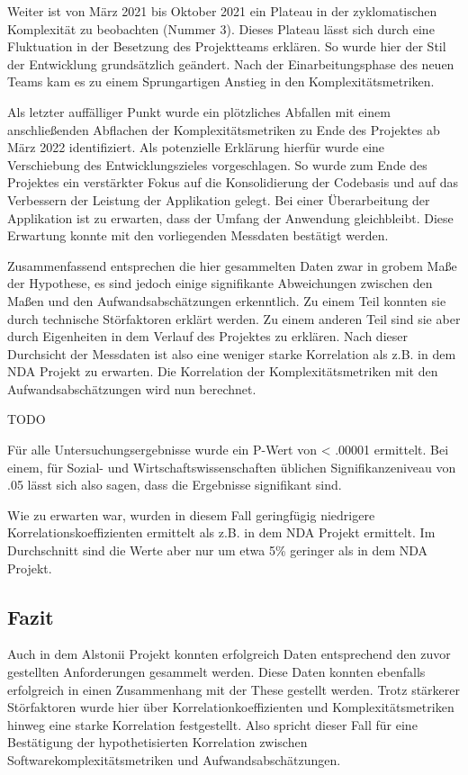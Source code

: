 Weiter ist von März 2021 bis Oktober 2021 ein Plateau in der
zyklomatischen Komplexität zu beobachten (Nummer 3). Dieses Plateau
lässt sich durch eine Fluktuation in der Besetzung des Projektteams
erklären. So wurde hier der Stil der Entwicklung grundsätzlich geändert.
Nach der Einarbeitungsphase des neuen Teams kam es zu einem
Sprungartigen Anstieg in den Komplexitätsmetriken.

Als letzter auffälliger Punkt wurde ein plötzliches Abfallen mit einem
anschließenden Abflachen der Komplexitätsmetriken zu Ende des Projektes
ab März 2022 identifiziert. Als potenzielle Erklärung hierfür wurde eine
Verschiebung des Entwicklungszieles vorgeschlagen. So wurde zum Ende des
Projektes ein verstärkter Fokus auf die Konsolidierung der Codebasis und
auf das Verbessern der Leistung der Applikation gelegt. Bei einer
Überarbeitung der Applikation ist zu erwarten, dass der Umfang der
Anwendung gleichbleibt. Diese Erwartung konnte mit den vorliegenden
Messdaten bestätigt werden.

Zusammenfassend entsprechen die hier gesammelten Daten zwar in grobem
Maße der Hypothese, es sind jedoch einige signifikante Abweichungen
zwischen den Maßen und den Aufwandsabschätzungen erkenntlich. Zu einem
Teil konnten sie durch technische Störfaktoren erklärt werden. Zu einem
anderen Teil sind sie aber durch Eigenheiten in dem Verlauf des
Projektes zu erklären. Nach dieser Durchsicht der Messdaten ist also
eine weniger starke Korrelation als z.B. in dem NDA Projekt zu erwarten.
Die Korrelation der Komplexitätsmetriken mit den Aufwandsabschätzungen
wird nun berechnet.

TODO

Für alle Untersuchungsergebnisse wurde ein P-Wert von \textless{} .00001
ermittelt.
Bei einem, für Sozial- und Wirtschaftswissenschaften üblichen
Signifikanzeniveau von .05 lässt sich also sagen, dass die Ergebnisse
signifikant sind.

Wie zu erwarten war, wurden in diesem Fall geringfügig niedrigere
Korrelationskoeffizienten ermittelt als z.B. in dem NDA Projekt
ermittelt. Im Durchschnitt sind die Werte aber nur um etwa 5\% geringer
als in dem NDA Projekt.

\subsection{Fazit}\label{Alstonii-fazit}

Auch in dem Alstonii Projekt konnten erfolgreich Daten entsprechend
den zuvor gestellten Anforderungen gesammelt werden. Diese Daten konnten
ebenfalls erfolgreich in einen Zusammenhang mit der These gestellt
werden. Trotz stärkerer Störfaktoren wurde hier über
Korrelationkoeffizienten und Komplexitätsmetriken hinweg eine starke
Korrelation festgestellt. Also spricht dieser Fall für eine Bestätigung
der hypothetisierten Korrelation zwischen Softwarekomplexitätsmetriken
und Aufwandsabschätzungen.

